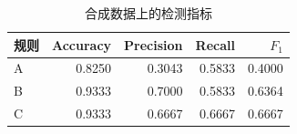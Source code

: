 \begin{table}[htbp]\centering
\caption{合成数据上的检测指标}\label{tab:metrics}
\begin{tabular}{lrrrr}\toprule
规则 & Accuracy & Precision & Recall & $F_1$\\\midrule
A & 0.8250 & 0.3043 & 0.5833 & 0.4000\\
B & 0.9333 & 0.7000 & 0.5833 & 0.6364\\
C & 0.9333 & 0.6667 & 0.6667 & 0.6667\\
\bottomrule\end{tabular}\end{table}
